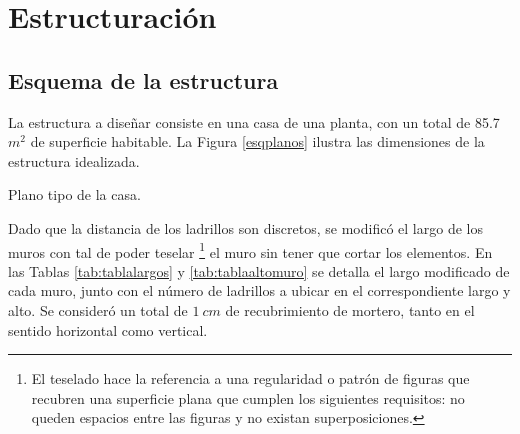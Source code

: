 \newpage
\section{Estructuración}

\subsection{Esquema de la estructura}

La estructura a diseñar consiste en una casa de una planta, con un total de 85.7 $m^2$ de superficie habitable. La Figura \ref{esqplanos} ilustra las dimensiones de la estructura idealizada.

\begin{images}[\label{esqplanos}]{Plano tipo de la casa.}
\end{images}

Dado que la distancia de los ladrillos son discretos, se modificó el largo de los muros con tal de poder teselar \footnote{El teselado hace la referencia a una regularidad o patrón de figuras que recubren una superficie plana que cumplen los siguientes requisitos: no queden espacios entre las figuras y no existan superposiciones.} el muro sin tener que cortar los elementos. En las Tablas \ref{tab:tablalargos} y \ref{tab:tablaaltomuro} se detalla el largo modificado de cada muro, junto con el número de ladrillos a ubicar en el correspondiente largo y alto. Se consideró un total de $1\ cm$ de recubrimiento de mortero, tanto en el sentido horizontal como vertical.

\begin{table}[H]
  \centering
  \caption{Distancias finales de cada muro.}
  \label{tab:tablalargos}
\end{table}

